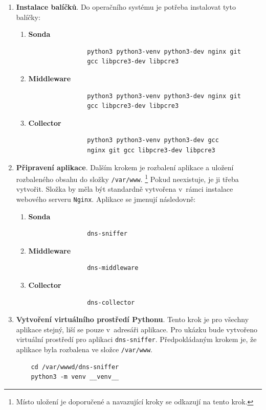 \documentclass[thesis=M,czech]{src/FITthesis}[2019/12/23]
\begin{document}
\begin{enumerate}
	\item \textbf{Instalace balíčků}. Do operačního systému je potřeba instalovat tyto balíčky:
	\begin{enumerate}
			\item \textbf{Sonda}
			\begin{verbatim}
				python3 python3-venv python3-dev nginx git
				gcc libpcre3-dev libpcre3
			\end{verbatim}
			\item \textbf{Middleware}
			\begin{verbatim}
				python3 python3-venv python3-dev nginx git
				gcc libpcre3-dev libpcre3
			\end{verbatim}
			\item \textbf{Collector}
			\begin{verbatim}
				python3 python3-venv python3-dev gcc
				nginx git gcc libpcre3-dev libpcre3
			\end{verbatim}
	\end{enumerate}
	
	\item \textbf{Připravení aplikace}. Dalším krokem je rozbalení aplikace a uložení rozbaleného obsahu do složky \texttt{/var/www}. \footnote{Místo uložení je doporučené a navazující kroky se odkazují na tento krok.} Pokud neexistuje, je ji třeba vytvořit. Složka by měla být standardně vytvořena v~rámci instalace webového serveru \texttt{Nginx}. Aplikace se jmenují následovně:
	\begin{enumerate}
			\item \textbf{Sonda}
			\begin{verbatim}
				dns-sniffer
			\end{verbatim}
			\item \textbf{Middleware}
			\begin{verbatim}
				dns-middleware
			\end{verbatim}
			\item \textbf{Collector}
			\begin{verbatim}
				dns-collector
			\end{verbatim}
	\end{enumerate}
	
	\item \textbf{Vytvoření virtuálního prostředí Pythonu}. Tento krok je pro všechny aplikace stejný, liší se pouze v~adresáři aplikace. Pro ukázku bude vytvořeno virtuální prostředí pro aplikaci \texttt{dns-sniffer}. Předpokládaným krokem je, že aplikace byla rozbalena ve složce \texttt{/var/www}. 
	\begin{verbatim}
	cd /var/wwwd/dns-sniffer
	python3 -m venv __venv__
	\end{verbatim}
	

\end{enumerate}
\end{document}

